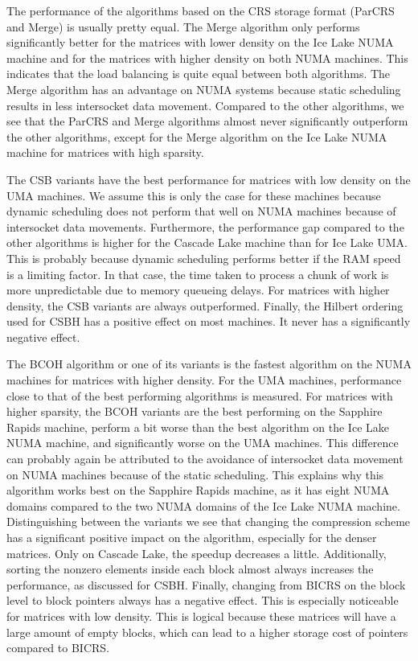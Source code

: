 \documentclass{siamart220329}
\begin{document}
The performance of the algorithms based on the CRS storage format (ParCRS and Merge) is usually pretty equal. The Merge algorithm only performs significantly better for the matrices with lower density on the Ice Lake NUMA machine and for the matrices with higher density on both NUMA machines. This indicates that the load balancing is quite equal between both algorithms. The Merge algorithm has an advantage on NUMA systems because static scheduling results in less intersocket data movement. Compared to the other algorithms, we see that the ParCRS and Merge algorithms almost never significantly outperform the other algorithms, except for the Merge algorithm on the Ice Lake NUMA machine for matrices with high sparsity.

The CSB variants have the best performance for matrices with low density on the UMA machines. We assume this is only the case for these machines because dynamic scheduling does not perform that well on NUMA machines because of intersocket data movements. Furthermore, the performance gap compared to the other algorithms is higher for the Cascade Lake machine than for Ice Lake UMA. This is probably because dynamic scheduling performs better if the RAM speed is a limiting factor. In that case, the time taken to process a chunk of work is more unpredictable due to memory queueing delays. For matrices with higher density, the CSB variants are always outperformed. Finally, the Hilbert ordering used for CSBH has a positive effect on most machines. It never has a significantly negative effect.

The BCOH algorithm or one of its variants is the fastest algorithm on the NUMA machines for matrices with higher density. For the UMA machines, performance close to that of the best performing algorithms is measured. For matrices with higher sparsity, the BCOH variants are the best performing on the Sapphire Rapids machine, perform a bit worse than the best algorithm on the Ice Lake NUMA machine, and significantly worse on the UMA machines. This difference can probably again be attributed to the avoidance of intersocket data movement on NUMA machines because of the static scheduling. This explains why this algorithm works best on the Sapphire Rapids machine, as it has eight NUMA domains compared to the two NUMA domains of the Ice Lake NUMA machine. Distinguishing between the variants we see that changing the compression scheme has a significant positive impact on the algorithm, especially for the denser matrices. Only on Cascade Lake, the speedup decreases a little. Additionally, sorting the nonzero elements inside each block almost always increases the performance, as discussed for CSBH. Finally, changing from BICRS on the block level to block pointers always has a negative effect. This is especially noticeable for matrices with low density. This is logical because these matrices will have a large amount of empty blocks, which can lead to a higher storage cost of pointers compared to BICRS.
\end{document}
